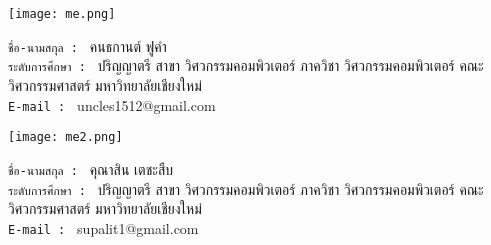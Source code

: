 \documentclass[semifinal]{cpecmu}
\author{นายคนธกานต์ ฟูคำ}{Konthakarn Fukam}{630610719}
\author{นายคุณาสิน เตชะสืบ}{Kunasin Techasueb}{630610721}
\begin{document}


\pagestyle{empty}\cleardoublepage
\normalspacing \setcounter{page}{1}  \pagestyle{cpecmu}





\ifproject

\fi



\ifproject
\normalspacing
\appendix


\ifglossary\glossarypage\fi

\ifindex\indexpage\fi

\begin{biosketch}
\begin{center}
  \texttt{[image: me.png]}
\end{center}
\texttt{ชื่อ-นามสกุล : } คนธกานต์ ฟูคำ
\\
\texttt{ระดับการศึกษา : } ปริญญาตรี สาขา วิศวกรรมคอมพิวเตอร์ ภาควิชา วิศวกรรมคอมพิวเตอร์ คณะ
วิศวกรรมศาสตร์ มหาวิทยาลัยเชียงใหม่
\\
\texttt{E-mail : } uncles1512@gmail.com
\begin{center}
  \texttt{[image: me2.png]}
\end{center}
\texttt{ชื่อ-นามสกุล : } คุณาสิน เตชะสืบ
\\
\texttt{ระดับการศึกษา : } ปริญญาตรี สาขา วิศวกรรมคอมพิวเตอร์ ภาควิชา วิศวกรรมคอมพิวเตอร์ คณะ
วิศวกรรมศาสตร์ มหาวิทยาลัยเชียงใหม่
\\
\texttt{E-mail : } supalit1@gmail.com
 \end{biosketch}
\fi  \ifproject
\end{document}
